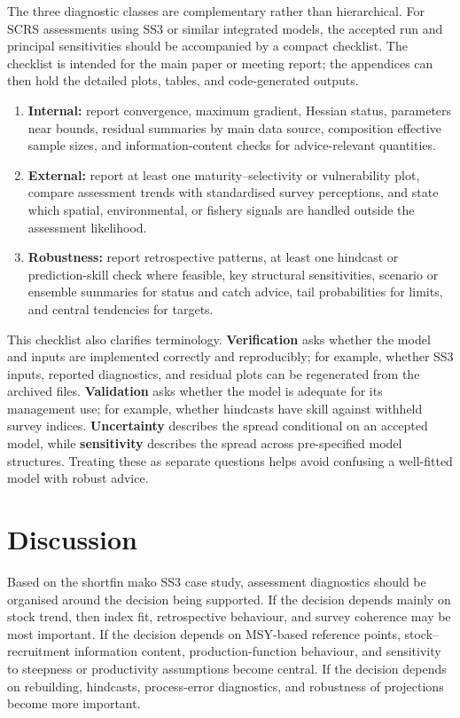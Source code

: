 \documentclass[11pt,a4paper]{article}
\begin{document}
The three diagnostic classes are complementary rather than hierarchical. For SCRS assessments using SS3 or similar integrated models, the accepted run and principal sensitivities should be accompanied by a compact checklist. The checklist is intended for the main paper or meeting report; the appendices can then hold the detailed plots, tables, and code-generated outputs.

\begin{enumerate}
  \item \textbf{Internal:} report convergence, maximum gradient, Hessian status, parameters near bounds, residual summaries by main data source, composition effective sample sizes, and information-content checks for advice-relevant quantities.
  \item \textbf{External:} report at least one maturity--selectivity or vulnerability plot, compare assessment trends with standardised survey perceptions, and state which spatial, environmental, or fishery signals are handled outside the assessment likelihood.
  \item \textbf{Robustness:} report retrospective patterns, at least one hindcast or prediction-skill check where feasible, key structural sensitivities, scenario or ensemble summaries for status and catch advice, tail probabilities for limits, and central tendencies for targets.
\end{enumerate}

This checklist also clarifies terminology. \textbf{Verification} asks whether the model and inputs are implemented correctly and reproducibly; for example, whether SS3 inputs, reported diagnostics, and residual plots can be regenerated from the archived files. \textbf{Validation} asks whether the model is adequate for its management use; for example, whether hindcasts have skill against withheld survey indices. \textbf{Uncertainty} describes the spread conditional on an accepted model, while \textbf{sensitivity} describes the spread across pre-specified model structures. Treating these as separate questions helps avoid confusing a well-fitted model with robust advice.

\section{Discussion}

Based on the shortfin mako SS3 case study, assessment diagnostics should be organised around the decision being supported. If the decision depends mainly on stock trend, then index fit, retrospective behaviour, and survey coherence may be most important. If the decision depends on MSY-based reference points, stock--recruitment information content, production-function behaviour, and sensitivity to steepness or productivity assumptions become central. If the decision depends on rebuilding, hindcasts, process-error diagnostics, and robustness of projections become more important.
\end{document}
